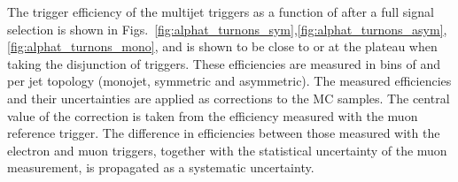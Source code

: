 


The trigger efficiency of the multijet triggers as a function of \mht after a full signal selection 
is shown in Figs.~\ref{fig:alphat_turnons_sym},\ref{fig:alphat_turnons_asym},\ref{fig:alphat_turnons_mono}, and is shown to be close to or at the plateau when taking 
the disjunction of triggers. These efficiencies are measured in bins of \scalht and \mht
per jet topology (monojet, symmetric and asymmetric). The measured
efficiencies and their uncertainties are applied as corrections to the MC
samples. The central value of the correction is taken from the efficiency
measured with the muon reference trigger. The difference in efficiencies between
those measured with the electron and muon triggers, together with the
statistical uncertainty of the muon measurement, is propagated as a systematic
uncertainty.

